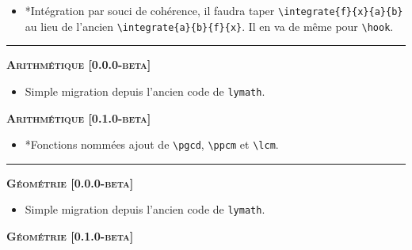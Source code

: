 \documentclass[12pt,a4paper]{book}
\makeatletter
\newcommand\env[1]{\texttt{#1}}
\newcommand\macro[1]{\env{\textbackslash{}#1}}
\theoremstyle{definition}
\newcommand\separation{
	\medskip
	\hfill\rule{0.5\textwidth}{0.75pt}\hfill
	\medskip
}
\newcommand\topic{\@ifstar{\@topic@star}{\@topic@no@star}}
\newcommand\@topic@no@star[1]{%
	\textbf{\textsc{#1}.}%
}
\newcommand\@topic@star[1]{%
	\textbf{\textsc{#1} :}%
}
\makeatother
\begin{document}
{{\begin{description}
\begin{itemize}[itemsep=.5em]
    
        
    
        \item \topic*{Intégration}
              par souci de cohérence, il faudra taper \verb#\integrate{f}{x}{a}{b}# au lieu de l'ancien \verb#\integrate{a}{b}{f}{x}#.
              Il en va de même pour \macro{hook}.
    
    
        
    \end{itemize}
    
    
    \separation
    
    
    
    
    \begin{center}
        \textbf{\textsc{Arithmétique [0.0.0-beta]}}
    \end{center}
    
    \begin{itemize}[itemsep=.5em]
        \item Simple migration depuis l'ancien code de \verb+lymath+.
    \end{itemize}
    
    
    \begin{center}
        \textbf{\textsc{Arithmétique [0.1.0-beta]}}
    \end{center}
    
    \begin{itemize}[itemsep=.5em]
        \item \topic*{Fonctions nommées} ajout de \macro{pgcd}, \macro{ppcm} et \macro{lcm}.
    \end{itemize}
    
    
    \separation
    
    
    
    
    \begin{center}
        \textbf{\textsc{Géométrie [0.0.0-beta]}}
    \end{center}
    
    \begin{itemize}[itemsep=.5em]
        \item Simple migration depuis l'ancien code de \verb+lymath+.
    \end{itemize}
    
    
    \begin{center}
        \textbf{\textsc{Géométrie [0.1.0-beta]}}
    \end{center}
    

\end{description}}}
\end{document}
